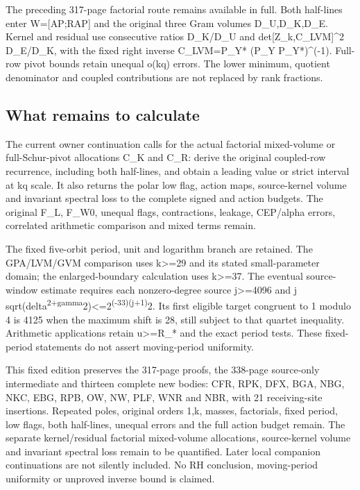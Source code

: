 \documentclass[
]{article}
\begin{document}
The preceding 317-page factorial route remains available in full. Both
half-lines enter W={[}AP;RAP{]} and the original three Gram volumes
D\_U,D\_K,D\_E. Kernel and residual use consecutive ratios D\_K/D\_U and
\textbar det{[}Z\_k,C\_LVM{]}\textbar\^{}2 D\_E/D\_K, with the fixed
right inverse C\_LVM=P\_Y* (P\_Y P\_Y*)\^{}(-1). Full-row pivot bounds
retain unequal o(kq) errors. The lower minimum, quotient denominator and
coupled contributions are not replaced by rank fractions.

\subsection{What remains to calculate}\label{what-remains-to-calculate}

The current owner continuation calls for the actual factorial
mixed-volume or full-Schur-pivot allocations C\_K and C\_R: derive the
original coupled-row recurrence, including both half-lines, and obtain a
leading value or strict interval at kq scale. It also returns the polar
low flag, action maps, source-kernel volume and invariant spectral loss
to the complete signed and action budgets. The original F\_L, F\_W0,
unequal flags, contractions, leakage, CEP/alpha errors, correlated
arithmetic comparison and mixed terms remain.

The fixed five-orbit period, unit and logarithm branch are retained. The
GPA/LVM/GVM comparison uses k\textgreater=29 and its stated
small-parameter domain; the enlarged-boundary calculation uses
k\textgreater=37. The eventual source-window estimate requires each
nonzero-degree source j\textgreater=4096 and j
sqrt(delta\textsuperscript{2+gamma}2)\textless=2\textsuperscript{(-33)(j+1)}2.
Its first eligible target congruent to 1 modulo 4 is 4125 when the
maximum shift is 28, still subject to that quartet inequality.
Arithmetic applications retain \textbar u\textbar\textgreater=R\_* and
the exact period tests. These fixed-period statements do not assert
moving-period uniformity.

This fixed edition preserves the 317-page proofs, the 338-page
source-only intermediate and thirteen complete new bodies: CFR, RPK,
DFX, BGA, NBG, NKC, EBG, RPB, OW, NW, PLF, WNR and NBR, with 21
receiving-site insertions. Repeated poles, original orders 1,k, masses,
factorials, fixed period, low flags, both half-lines, unequal errors and
the full action budget remain. The separate kernel/residual factorial
mixed-volume allocations, source-kernel volume and invariant spectral
loss remain to be quantified. Later local companion continuations are
not silently included. No RH conclusion, moving-period uniformity or
unproved inverse bound is claimed.
\end{document}
